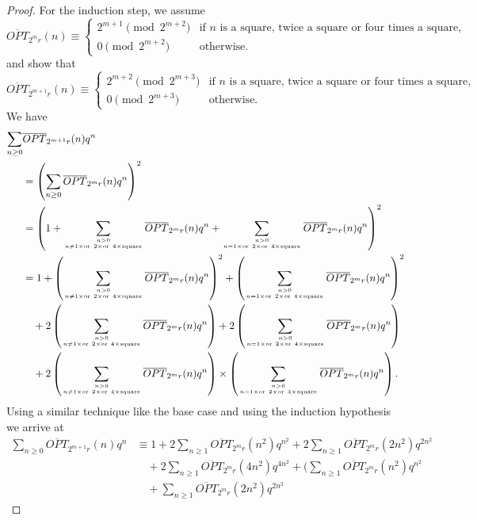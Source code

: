 \documentclass[12pt,reqno]{amsart}
\numberwithin{equation}{section}
\newcommand\mycom[2]{\genfrac{}{}{0pt}{}{#1}{#2}}
\newcommand{\opt}{\overline{OPT}}
\begin{document}
\begin{proof}
For the induction step, we assume
\[
        \opt_{2^mr}(n)\equiv \begin{cases} 2^{m+1}\pmod {2^{m+2}}& \text{if $n$ is a square, twice a square or four times a square,}\\0 \pmod {2^{m+2}} & \text{otherwise}.
    \end{cases}
    \]
    and show that
    \[
        \opt_{2^{m+1}r}(n)\equiv \begin{cases} 2^{m+2}\pmod {2^{m+3}}& \text{if $n$ is a square, twice a square or four times a square,}\\0 \pmod {2^{m+3}} & \text{otherwise}.
    \end{cases}
    \]
    We have
    \begin{align*}
        \sum_{n\geq 0}&\opt_{2^{m+1}r}(n)q^n\\
        &=\left(\sum_{n\geq 0}\opt_{2^{m}r}(n)q^n\right)^2\\
        &=\left(1+\sum_{\mycom{n> 0}{n\neq 1\times \text{or}~2\times \text{or}~4\times \text{square}}}\opt_{2^{m}r}(n)q^n+\sum_{\mycom{n> 0}{n= 1\times \text{or}~2\times \text{or}~4\times \text{square}}}\opt_{2^{m}r}(n)q^n\right)^2\\
        &=1+\left(\sum_{\mycom{n> 0}{n\neq 1\times \text{or}~2\times \text{or}~4\times \text{square}}}\opt_{2^{m}r}(n)q^n\right)^2+\left(\sum_{\mycom{n> 0}{n= 1\times \text{or}~2\times \text{or}~4\times \text{square}}}\opt_{2^{m}r}(n)q^n\right)^2\\
        &\quad +2 \left(\sum_{\mycom{n> 0}{n\neq 1\times \text{or}~2\times \text{or}~4\times \text{square}}}\opt_{2^{m}r}(n)q^n\right)+2\left(\sum_{\mycom{n> 0}{n= 1\times \text{or}~2\times \text{or}~4\times \text{square}}}\opt_{2^{m}r}(n)q^n\right)\\
        &\quad +2\left(\sum_{\mycom{n>0}{n\neq 1\times \text{or}~2\times \text{or}~4\times \text{square}}}\opt_{2^{m}r}(n)q^n\right) \times \left(\sum_{\mycom{n> 0}{n= 1\times \text{or}~2\times \text{or}~4\times \text{square}}}\opt_{2^{m}r}(n)q^n\right).
    \end{align*}
    Using a similar technique like the base case and using the induction hypothesis we arrive at
    \begin{align*}
       \sum_{n\geq 0}\opt_{2^{m+1}r}(n)q^n&\equiv 1+2\sum_{n\geq 1}\opt_{2^mr}(n^2)q^{n^2}+2\sum_{n\geq 1}\opt_{2^mr}(2n^2)q^{2n^2}\\
       &\quad +2\sum_{n\geq 1}\opt_{2^mr}(4n^2)q^{4n^2}+\Biggl(\sum_{n\geq 1}\opt_{2^mr}(n^2)q^{n^2}\\
       &\quad +\sum_{n\geq 1}\opt_{2^mr}(2n^2)q^{2n^2}

\end{align*}
\end{proof}
\end{document}
